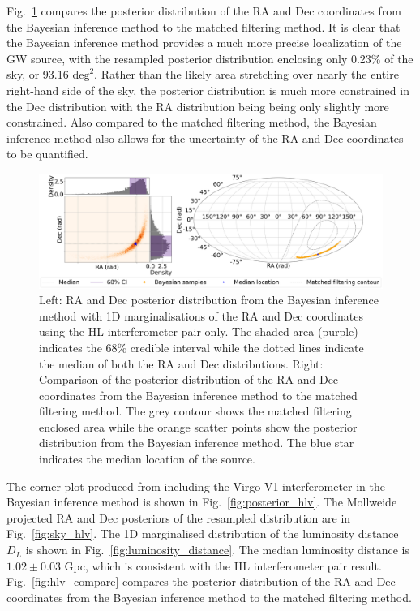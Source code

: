 \documentclass[11pt,a4paper]{article}
\begin{document}
Fig.~\ref{fig:hl_compare} compares the posterior distribution of the RA and Dec coordinates from the Bayesian inference method to the matched filtering method. It is clear that the Bayesian inference method provides a much more precise localization of the GW source, with the resampled posterior distribution enclosing only 0.23\% of the sky, or 93.16 $\mathrm{deg}^2$. Rather than the likely area stretching over nearly the entire right-hand side of the sky, the posterior distribution is much more constrained in the Dec distribution with the RA distribution being being only slightly more constrained. Also compared to the matched filtering method, the Bayesian inference method also allows for the uncertainty of the RA and Dec coordinates to be quantified.

\begin{landscape}
\begin{figure}
    \includegraphics[width=\columnwidth, keepaspectratio]{../figures/radec_posterior_HL.png}
    \caption{Left: RA and Dec posterior distribution from the Bayesian inference method with 1D marginalisations of the RA and Dec coordinates using the HL interferometer pair only. The shaded area (purple) indicates the 68\% credible interval while the dotted lines indicate the median of both the RA and Dec distributions. Right: Comparison of the posterior distribution of the RA and Dec coordinates from the Bayesian inference method to the matched filtering method. The grey contour shows the matched filtering enclosed area while the orange scatter points show the posterior distribution from the Bayesian inference method. The blue star indicates the median location of the source.}
    \label{fig:hl_compare}
\end{figure}
\end{landscape}

\clearpage
The corner plot produced from including the Virgo V1 interferometer in the Bayesian inference method is shown in Fig.~\ref{fig:posterior_hlv}. The Mollweide projected RA and Dec posteriors of the resampled distribution are in Fig.~\ref{fig:sky_hlv}. The 1D marginalised distribution of the luminosity distance $D_L$ is shown in Fig.~\ref{fig:luminosity_distance}. The median luminosity distance is $1.02 \pm 0.03$ Gpc, which is consistent with the HL interferometer pair result. Fig.~\ref{fig:hlv_compare} compares the posterior distribution of the RA and Dec coordinates from the Bayesian inference method to the matched filtering method. 
\end{document}
